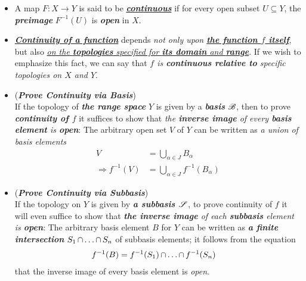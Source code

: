 \documentclass[11pt]{article}
\begin{document}
\begin{itemize}
\item \begin{definition}
A map $F: X \rightarrow Y$ is said to be \underline{\emph{\textbf{continuous}}} if for every open subset $U \subseteq Y$, the \emph{\textbf{preimage}} $F^{-1}(U)$ is \emph{\textbf{open}} in $X$.
\end{definition}

\item \begin{remark}
\underline{\emph{\textbf{Continuity of a function}}} depends \emph{not only upon \underline{\textbf{the function $f$ itself}}}, but also \underline{\emph{on the \textbf{topologies} specified for \textbf{its domain} and \textbf{range}}}. If we wish to emphasize this fact, we can say that \emph{$f$ is \textbf{continuous relative to} specific topologies on $X$ and $Y$}.
\end{remark}

\item \begin{remark} (\emph{\textbf{Prove Continuity via Basis}})\\
If the topology of \emph{\textbf{the range space}} $Y$ is given by a \emph{\textbf{basis}} ${\mathscr B}$, then to prove \emph{\textbf{continuity of $f$}} it suffices to show that \emph{the \textbf{inverse image} of every \textbf{basis element} is \textbf{open}}: The arbitrary open set $V$ of $Y$ can be written as \emph{a union of basis elements}
\begin{align*}
V &= \bigcup_{\alpha \in J}B_{\alpha}\\
\Rightarrow f^{-1}(V) &= \bigcup_{\alpha \in J}f^{-1}(B_{\alpha})
\end{align*}
\end{remark}

\item \begin{remark} (\emph{\textbf{Prove Continuity via Subbasis}})\\
If the topology on $Y$ is given by \emph{\textbf{a subbasis ${\mathscr S}$}}, to prove continuity of $f$ it will even suffice to show that \emph{\textbf{the inverse image} of each \textbf{subbasis} element is \textbf{open}}: The arbitrary basis element $B$ for $Y$ can be written as \emph{\textbf{a finite intersection}} $S_1 \,{\cap}\ldots{\cap}\, S_{n}$ of subbasis elements; it follows from the equation
\begin{align*}
f^{-1}(B) &= f^{-1}(S_1) \,{\cap}\ldots{\cap}\, f^{-1}(S_n)
\end{align*}
that the inverse image of every basis element is \emph{open}.
\end{remark}



\end{itemize}
\end{document}
